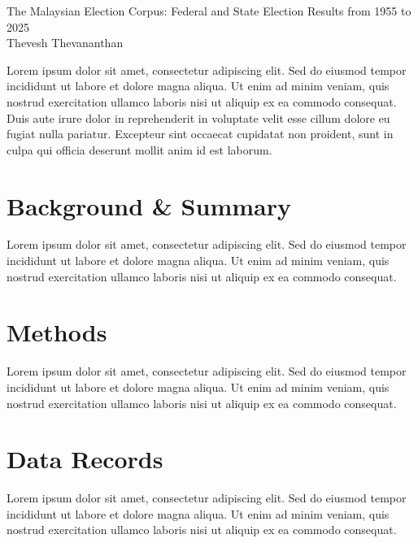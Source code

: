 \documentclass[11pt]{article}
\begin{document}

\phantom{Thevesh}

\vfill

\begin{center}
	\begin{minipage}{0.88\linewidth}
		\begin{center}
			\LARGE
			The Malaysian Election Corpus: Federal and State Election Results from 1955 to 2025 \\[0.21in]
			\Large
			Thevesh Thevananthan\\[0.15in]  %
		\end{center}
		\large 
		Lorem ipsum dolor sit amet, consectetur adipiscing elit. Sed do eiusmod tempor incididunt ut labore et dolore magna aliqua. Ut enim ad minim veniam, quis nostrud exercitation ullamco laboris nisi ut aliquip ex ea commodo consequat. Duis aute irure dolor in reprehenderit in voluptate velit esse cillum dolore eu fugiat nulla pariatur. Excepteur sint occaecat cupidatat non proident, sunt in culpa qui officia deserunt mollit anim id est laborum.
	\end{minipage}
\end{center}

\vfill

\phantom{Word Count:}

\newpage
{}


\section*{Background \& Summary}
Lorem ipsum dolor sit amet, consectetur adipiscing elit. Sed do eiusmod tempor incididunt ut labore et dolore magna aliqua. Ut enim ad minim veniam, quis nostrud exercitation ullamco laboris nisi ut aliquip ex\cite{ge00report,ge01report,ge02report,ge03report,ge04report,ge05report,ge06report,ge07report,ge08report,ge09report,ge10report,ge11report} ea commodo consequat.

\section*{Methods}
Lorem ipsum dolor sit amet, consectetur adipiscing elit. Sed do eiusmod tempor incididunt ut labore et dolore magna aliqua. Ut enim ad minim veniam, quis nostrud exercitation ullamco laboris nisi ut aliquip ex ea commodo consequat.

\section*{Data Records}
Lorem ipsum dolor sit amet, consectetur adipiscing elit. Sed do eiusmod tempor incididunt ut labore et dolore magna aliqua. Ut enim ad minim veniam, quis nostrud exercitation ullamco laboris nisi ut aliquip ex ea commodo consequat.
\end{document}
